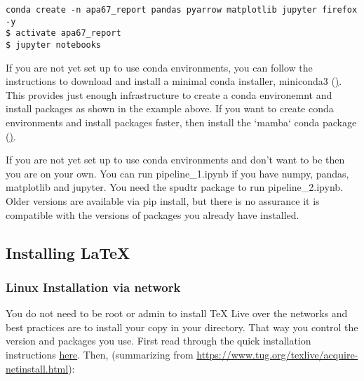 \documentclass[helv,letter,doc,natbib,11pt]{apa6}  %
\begin{document}
\begin{verbatim}
conda create -n apa67_report pandas pyarrow matplotlib jupyter firefox -y
$ activate apa67_report
$ jupyter notebooks
\end{verbatim}

If you are not yet set up to use conda environments, you can follow
the instructions to download and install a minimal conda installer,
miniconda3
(\href{https://docs.conda.io/en/latest/miniconda.html}). This provides
just enough infrastructure to create a conda environemnt and install
packages as shown in the example above. If you want to create conda
environments and install packages faster, then install the `mamba`
conda package (\href{https://mamba.readthedocs.io/en/latest/}).

If you are not yet set up to use conda environments and don't want to
be then you are on your own. You can run pipeline\_1.ipynb if you have
numpy, pandas, matplotlib and jupyter.  You need the spudtr package to
run pipeline\_2.ipynb. Older versions are available via pip install,
but there is no assurance it is compatible with the versions of
packages you already have installed.

\subsection{Installing \LaTeX}

\subsubsection{Linux Installation via network}

You do not need to be root or admin to install TeX Live over the
networks and best practices are to install your copy in your
directory. That way you control the version and packages you
use. First read through the quick installation instructions
\href{https://www.tug.org/texlive/quickinstall.html}{here}. Then,
(summarizing from
\url{https://www.tug.org/texlive/acquire-netinstall.html}):
\end{document}
